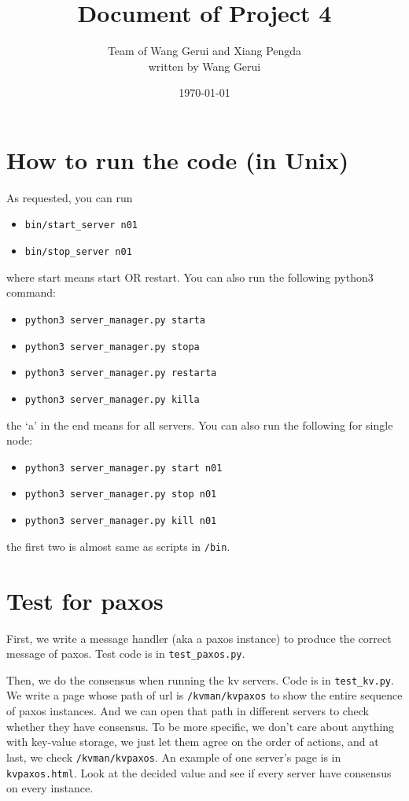 \documentclass{article}
\begin{document}
\title{Document of Project 4}
\author{Team of Wang Gerui and Xiang Pengda\\ written by Wang Gerui}
\date{\today}
\maketitle

\section{How to run the code (in Unix)}

As requested, you can run
\begin{itemize}
	\item \verb|bin/start_server n01|
	\item \verb|bin/stop_server n01|
\end{itemize}
where start means start OR restart.
You can also run the following python3 command:
\begin{itemize}
	\item \verb|python3 server_manager.py starta|
	\item \verb|python3 server_manager.py stopa|
	\item \verb|python3 server_manager.py restarta|
	\item \verb|python3 server_manager.py killa|
\end{itemize}
the `a' in the end means for all servers.
You can also run the following for single node:
\begin{itemize}
	\item \verb|python3 server_manager.py start n01|
	\item \verb|python3 server_manager.py stop n01|
	\item \verb|python3 server_manager.py kill n01|
\end{itemize}
the first two is almost same as scripts in {\tt /bin}.

\section{Test for paxos}

First, we write a message handler (aka a paxos instance) to produce the correct message of paxos. Test code is in \verb|test_paxos.py|.

Then, we do the consensus when running the kv servers. Code is in \verb|test_kv.py|. We write a page whose path of url is {\tt /kvman/kvpaxos} to show the entire sequence of paxos instances. And we can open that path in different servers to check whether they have consensus. To be more specific, we don't care about anything with key-value storage, we just let them agree on the order of actions, and at last, we check {\tt /kvman/kvpaxos}. An example of one server's page is in {\tt kvpaxos.html}. Look at the decided value and see if every server have consensus on every instance.
\end{document}
